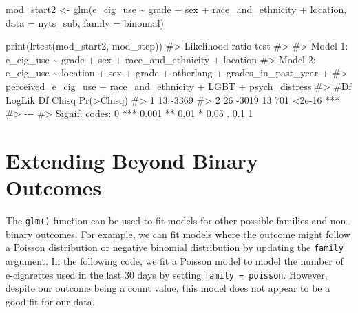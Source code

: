 \documentclass[
  letterpaper,
]{latex/krantz}
\makeatletter
\newenvironment{Shaded}{\begin{snugshade}}{\end{snugshade}}
\newcommand{\AttributeTok}[1]{\textcolor[rgb]{0.40,0.45,0.13}{#1}}
\newcommand{\CommentTok}[1]{\textcolor[rgb]{0.37,0.37,0.37}{#1}}
\newcommand{\FunctionTok}[1]{\textcolor[rgb]{0.28,0.35,0.67}{#1}}
\newcommand{\NormalTok}[1]{\textcolor[rgb]{0.00,0.23,0.31}{#1}}
\newcommand{\OtherTok}[1]{\textcolor[rgb]{0.00,0.23,0.31}{#1}}
\newcommand{\SpecialCharTok}[1]{\textcolor[rgb]{0.37,0.37,0.37}{#1}}
\newenvironment{kframe}{%
\medskip{}
\setlength{\fboxsep}{.8em}
 \def\at@end@of@kframe{}%
 \ifinner\ifhmode%
  \def\at@end@of@kframe{\end{minipage}}%
  \begin{minipage}{\columnwidth}%
 \fi\fi%
 \def\FrameCommand##1{\hskip\@totalleftmargin \hskip-\fboxsep
 \colorbox{shadecolor}{##1}\hskip-\fboxsep
     \hskip-\linewidth \hskip-\@totalleftmargin \hskip\columnwidth}%
 \MakeFramed {\advance\hsize-\width
   \@totalleftmargin\z@ \linewidth\hsize
   \@setminipage}}%
 {\par\unskip\endMakeFramed%
 \at@end@of@kframe}
\renewenvironment{Shaded}{\begin{kframe}}{\end{kframe}}
\makeatother
\begin{document}
\begin{Shaded}
\begin{Highlighting}[]
\NormalTok{mod\_start2 }\OtherTok{\textless{}{-}} \FunctionTok{glm}\NormalTok{(e\_cig\_use }\SpecialCharTok{\textasciitilde{}}\NormalTok{ grade }\SpecialCharTok{+}\NormalTok{ sex }\SpecialCharTok{+}\NormalTok{ race\_and\_ethnicity }\SpecialCharTok{+} 
\NormalTok{                    location, }\AttributeTok{data =}\NormalTok{ nyts\_sub, }\AttributeTok{family =}\NormalTok{ binomial)}
\end{Highlighting}
\end{Shaded}

\begin{Shaded}
\begin{Highlighting}[]
\FunctionTok{print}\NormalTok{(}\FunctionTok{lrtest}\NormalTok{(mod\_start2, mod\_step))}
\CommentTok{\#\textgreater{} Likelihood ratio test}
\CommentTok{\#\textgreater{} }
\CommentTok{\#\textgreater{} Model 1: e\_cig\_use \textasciitilde{} grade + sex + race\_and\_ethnicity + location}
\CommentTok{\#\textgreater{} Model 2: e\_cig\_use \textasciitilde{} location + sex + grade + otherlang + grades\_in\_past\_year + }
\CommentTok{\#\textgreater{}     perceived\_e\_cig\_use + race\_and\_ethnicity + LGBT + psych\_distress}
\CommentTok{\#\textgreater{}   \#Df LogLik Df Chisq Pr(\textgreater{}Chisq)    }
\CommentTok{\#\textgreater{} 1  13  {-}3369                        }
\CommentTok{\#\textgreater{} 2  26  {-}3019 13   701     \textless{}2e{-}16 ***}
\CommentTok{\#\textgreater{} {-}{-}{-}}
\CommentTok{\#\textgreater{} Signif. codes:  0 \textquotesingle{}***\textquotesingle{} 0.001 \textquotesingle{}**\textquotesingle{} 0.01 \textquotesingle{}*\textquotesingle{} 0.05 \textquotesingle{}.\textquotesingle{} 0.1 \textquotesingle{} \textquotesingle{} 1}
\end{Highlighting}
\end{Shaded}

\section{\texorpdfstring{Extending Beyond Binary Outcomes
}{Extending Beyond Binary Outcomes }}\label{extending-beyond-binary-outcomes}

The \texttt{glm()} function can
be used to fit models for other possible families and non-binary
outcomes. For example, we can fit models where the outcome might follow
a Poisson distribution or negative binomial distribution by updating the
\texttt{family} argument. In the following code, we fit a Poisson model
to model the number of e-cigarettes used in the last 30 days by setting
\texttt{family\ =\ poisson}. However, despite our outcome being a count
value, this model does not appear to be a good fit for our data.
\end{document}

